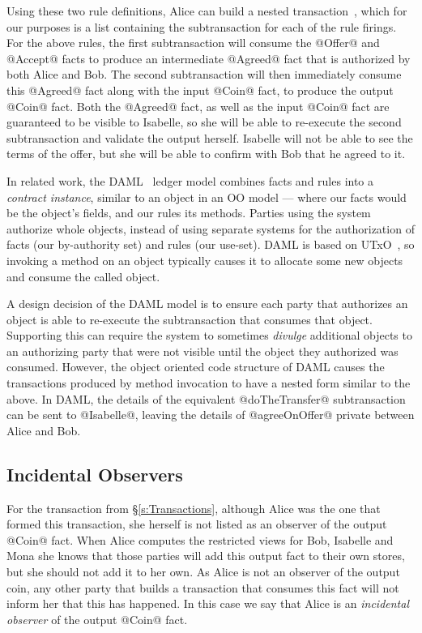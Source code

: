 Using these two rule definitions, Alice can build a nested transaction~\cite{Moss1981:Nested}, which for our purposes is a list containing the subtransaction for each of the rule firings. For the above rules, the first subtransaction will consume the @Offer@ and @Accept@ facts to produce an intermediate @Agreed@ fact that is authorized by both Alice and Bob. The second subtransaction will then immediately consume this @Agreed@ fact along with the input @Coin@ fact, to produce the output @Coin@ fact. Both the @Agreed@ fact, as well as the input @Coin@ fact are guaranteed to be visible to Isabelle, so she will be able to re-execute the second subtransaction and validate the output herself. Isabelle will not be able to see the terms of the offer, but she will be able to confirm with Bob that he agreed to it.

In related work, the DAML~\cite{DA2019:DAML} ledger model combines facts and rules into a \emph{contract instance}, similar to an object in an OO model --- where our facts would be the object's fields, and our rules its methods. Parties using the system authorize whole objects, instead of using separate systems for the authorization of facts (our by-authority set) and rules (our use-set). DAML is based on UTxO~\cite{Zahnentferner2018:UTxO}, so invoking a method on an object typically causes it to allocate some new objects and consume the called object.

A design decision of the DAML model is to ensure each party that authorizes an object is able to re-execute the subtransaction that consumes that object. Supporting this can require the system to sometimes \emph{divulge} additional objects to an authorizing party that were not visible until the object they authorized was consumed. However, the object oriented code structure of DAML causes the transactions produced by method invocation to have a nested form similar to the above. In DAML, the details of the equivalent @doTheTransfer@ subtransaction can be sent to @Isabelle@, leaving the details of @agreeOnOffer@ private between Alice and Bob.


\subsection{Incidental Observers}
For the transaction from \S\ref{s:Transactions}, although Alice was the one that formed this transaction, she herself is not listed as an observer of the output @Coin@ fact. When Alice computes the restricted views for Bob, Isabelle and Mona she knows that those parties will add this output fact to their own stores, but she should not add it to her own. As Alice is not an observer of the output coin, any other party that builds a transaction that consumes this fact will not inform her that this has happened. In this case we say that Alice is an \emph{incidental observer} of the output @Coin@ fact.


